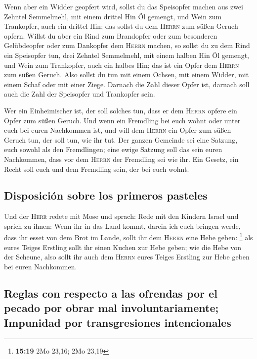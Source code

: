  Wenn aber ein Widder geopfert wird, sollst du das
Speisopfer machen aus zwei Zehntel Semmelmehl, mit einem drittel Hin Öl
gemengt,  und Wein zum Trankopfer, auch ein drittel Hin;
das sollst du dem \textsc{Herrn} zum süßen Geruch opfern. 
Willst du aber ein Rind zum Brandopfer oder zum besonderen Gelübdeopfer
oder zum Dankopfer dem \textsc{Herrn} machen,  so sollst
du zu dem Rind ein Speisopfer tun, drei Zehntel Semmelmehl, mit einem
halben Hin Öl gemengt,  und Wein zum Trankopfer, auch ein
halbes Hin; das ist ein Opfer dem \textsc{Herrn} zum süßen Geruch.
 Also sollst du tun mit einem Ochsen, mit einem Widder,
mit einem Schaf oder mit einer Ziege.  Darnach die Zahl
dieser Opfer ist, darnach soll auch die Zahl der Speisopfer und
Trankopfer sein.

 Wer ein Einheimischer ist, der soll solches tun, dass er
dem \textsc{Herrn} opfere ein Opfer zum süßen Geruch. 
Und wenn ein Fremdling bei euch wohnt oder unter euch bei euren
Nachkommen ist, und will dem \textsc{Herrn} ein Opfer zum süßen Geruch
tun, der soll tun, wie ihr tut.  Der ganzen Gemeinde sei
eine Satzung, euch sowohl als den Fremdlingen; eine ewige Satzung soll
das sein euren Nachkommen, dass vor dem \textsc{Herrn} der Fremdling sei
wie ihr.  Ein Gesetz, ein Recht soll euch und dem
Fremdling sein, der bei euch wohnt.

\hypertarget{disposiciuxf3n-sobre-los-primeros-pasteles}{%
\subsection{Disposición sobre los primeros
pasteles}\label{disposiciuxf3n-sobre-los-primeros-pasteles}}

 Und der \textsc{Herr} redete mit Mose und sprach:
 Rede mit den Kindern Israel und sprich zu ihnen: Wenn
ihr in das Land kommt, darein ich euch bringen werde, 
dass ihr esset von dem Brot im Lande, sollt ihr dem \textsc{Herrn} eine
Hebe geben: \footnote{\textbf{15:19} 2Mo 23,16; 2Mo 23,19}
 als eures Teiges Erstling sollt ihr einen Kuchen zur
Hebe geben; wie die Hebe von der Scheune,  also sollt ihr
auch dem \textsc{Herrn} eures Teiges Erstling zur Hebe geben bei euren
Nachkommen.

\hypertarget{reglas-con-respecto-a-las-ofrendas-por-el-pecado-por-obrar-mal-involuntariamente-impunidad-por-transgresiones-intencionales}{%
\subsection{Reglas con respecto a las ofrendas por el pecado por obrar
mal involuntariamente; Impunidad por transgresiones
intencionales}\label{reglas-con-respecto-a-las-ofrendas-por-el-pecado-por-obrar-mal-involuntariamente-impunidad-por-transgresiones-intencionales}}

